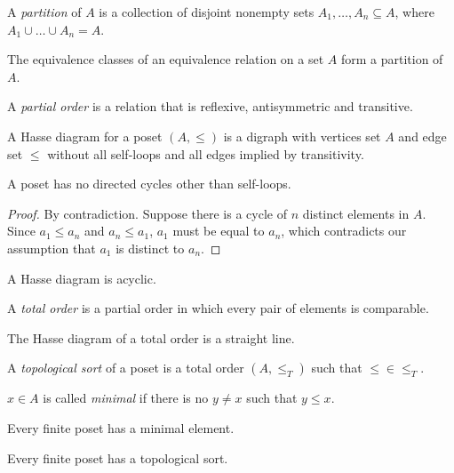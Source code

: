 \documentclass[11pt]{article}
\begin{document}
\begin{definition}
A \emph{partition} of $A$ is a collection of disjoint nonempty sets $A_1,\dots,A_n \subseteq A$,
where $A_1\cup\dots\cup A_n = A$.
\end{definition}

\begin{theorem}
The equivalence classes of an equivalence relation on a set $A$ form a partition of $A$.
\end{theorem}

\begin{definition}
A \emph{partial order} is a relation that is reflexive, antisymmetric and transitive.
\end{definition}

\begin{definition}
A Hasse diagram for a poset $(A,\leq)$ is a digraph with vertices set $A$ and edge set $\leq$
without all self-loops and all edges implied by transitivity.
\end{definition}

\begin{theorem}
A poset has no directed cycles other than self-loops.
\end{theorem}

\begin{proof}
By contradiction. Suppose there is a cycle of $n$ distinct elements in $A$. Since $a_1 \leq a_n$
and $a_n \leq a_1$, $a_1$ must be equal to $a_n$, which contradicts our assumption that $a_1$ is
distinct to $a_n$.
\end{proof}

\begin{corollary}
A Hasse diagram is acyclic.
\end{corollary}

\begin{definition}
A \emph{total order} is a partial order in which every pair of elements is comparable.
\end{definition}

\begin{proposition}
The Hasse diagram of a total order is a straight line.
\end{proposition}

\begin{definition}
A \emph{topological sort} of a poset is a total order $(A,\leq_T)$ such that $\leq \in \leq_T$.
\end{definition}

\begin{definition}
$x \in A$ is called \emph{minimal} if there is no $y \neq x$ such that $y \leq x$.
\end{definition}

\begin{lemma}
Every finite poset has a minimal element.
\end{lemma}

\begin{theorem}
Every finite poset has a topological sort.
\end{theorem}
\end{document}

